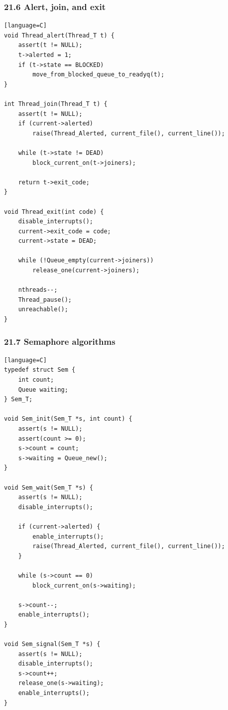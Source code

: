 \documentclass[11pt]{article}
\begin{document}
\subsubsection{21.6 Alert, join, and exit}\label{alert-join-and-exit}

\begin{verbatim}[language=C]
void Thread_alert(Thread_T t) {
    assert(t != NULL);
    t->alerted = 1;
    if (t->state == BLOCKED)
        move_from_blocked_queue_to_readyq(t);
}

int Thread_join(Thread_T t) {
    assert(t != NULL);
    if (current->alerted)
        raise(Thread_Alerted, current_file(), current_line());

    while (t->state != DEAD)
        block_current_on(t->joiners);

    return t->exit_code;
}

void Thread_exit(int code) {
    disable_interrupts();
    current->exit_code = code;
    current->state = DEAD;

    while (!Queue_empty(current->joiners))
        release_one(current->joiners);

    nthreads--;
    Thread_pause();
    unreachable();
}
\end{verbatim}

\subsubsection{21.7 Semaphore algorithms}\label{semaphore-algorithms}

\begin{verbatim}[language=C]
typedef struct Sem {
    int count;
    Queue waiting;
} Sem_T;

void Sem_init(Sem_T *s, int count) {
    assert(s != NULL);
    assert(count >= 0);
    s->count = count;
    s->waiting = Queue_new();
}

void Sem_wait(Sem_T *s) {
    assert(s != NULL);
    disable_interrupts();

    if (current->alerted) {
        enable_interrupts();
        raise(Thread_Alerted, current_file(), current_line());
    }

    while (s->count == 0)
        block_current_on(s->waiting);

    s->count--;
    enable_interrupts();
}

void Sem_signal(Sem_T *s) {
    assert(s != NULL);
    disable_interrupts();
    s->count++;
    release_one(s->waiting);
    enable_interrupts();
}
\end{verbatim}
\end{document}
